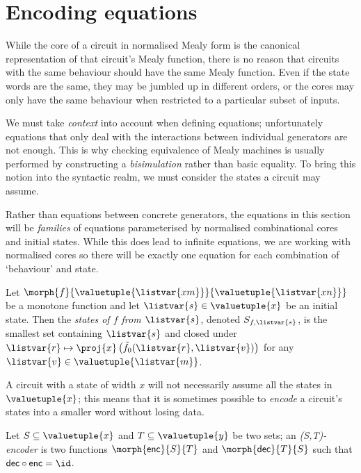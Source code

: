 \section{Encoding equations}

While the core of a circuit in normalised Mealy form is the canonical
representation of that circuit's Mealy function, there is no reason that
circuits with the same behaviour should have the same Mealy function.
Even if the state words are the same, they may be jumbled up in different
orders, or the cores may only have the same behaviour when restricted to a
particular subset of inputs.

We must take \emph{context} into account when defining
equations; unfortunately equations that only deal with the interactions between
individual generators are not enough.
This is why checking equivalence of Mealy machines is usually performed by
constructing a \emph{bisimulation} rather than basic equality.
To bring this notion into the syntactic realm, we must consider the states a
circuit may assume.

\begin{remark}
    Rather than equations between concrete generators, the equations in this
    section will be \emph{families} of equations parameterised by normalised
    combinational cores and initial states.
    While this does lead to infinite equations, we are working with normalised
    cores so there will be exactly one equation for each combination of
    `behaviour' and state.
\end{remark}

\begin{definition}[States]
    Let \(\morph{f}{\valuetuple{\listvar{xm}}}{\valuetuple{\listvar{xn}}}\) be a
    monotone function and let \(\listvar{s} \in  \valuetuple{x}\) be an
    initial state.
    Then the \emph{states of \(f\) from \(\listvar{s}\)}, denoted
    \(S_{f,\listvar{s}}\), is the smallest set containing \(\listvar{s}\) and
    closed under \(
    \listvar{r}
    \mapsto
    \proj{x}\left(\tilde{f}_0(\listvar{r},\listvar{v})\right)
    \) for any \(\listvar{v} \in \valuetuple{\listvar{m}}\).
\end{definition}

A circuit with a state of width \(x\) will not necessarily assume all the states
in \(\valuetuple{x}\); this means that it is sometimes possible to \emph{encode}
a circuit's states into a smaller word without losing data.

\begin{definition}[Encoder]\label{def:encoder}
    Let \(S \subseteq \valuetuple{x}\) and \(T \subseteq \valuetuple{y}\) be two
    sets; an \emph{(S,T)-encoder} is two functions \(
    \morph{\mathsf{enc}}{S}{T}
    \) and \(
    \morph{\mathsf{dec}}{T}{S}
    \) such that \(\mathsf{dec} \circ \mathsf{enc} = \id\).
\end{definition}


